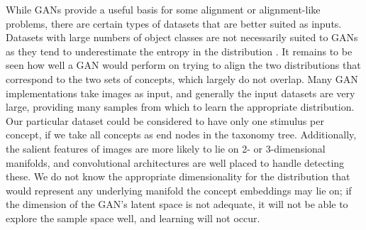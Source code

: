 While GANs provide a useful basis for some alignment or alignment-like problems, there are certain types of datasets that are better suited as inputs. Datasets with large numbers of object classes are not necessarily suited to GANs as they tend to underestimate the entropy in the distribution \cite{ImprovedTechniquesTrainingGANS}. It remains to be seen how well a GAN would perform on trying to align the two distributions that correspond to the two sets of concepts, which largely do not overlap.  Many GAN implementations take images as input, and generally the input datasets are very large, providing many samples from which to learn the appropriate distribution. Our particular dataset could be considered to have only one stimulus per concept, if we take all concepts as end nodes in the taxonomy tree.  Additionally, the salient features of images are more likely to lie on 2- or 3-dimensional manifolds, and convolutional architectures are well placed to handle detecting these. We do not know the appropriate dimensionality for the distribution that would represent any underlying manifold the concept embeddings may lie on; if the dimension of the GAN's latent space is not adequate, it will not be able to explore the sample space well, and learning will not occur. 

